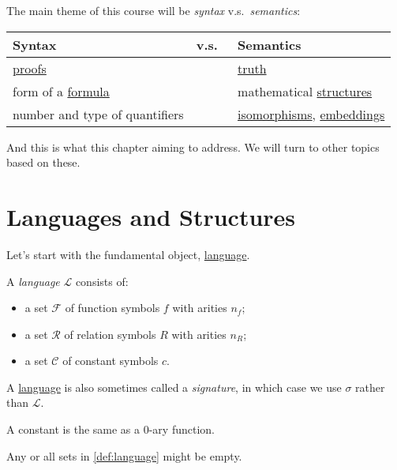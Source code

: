 The main theme of this course will be \emph{syntax} v.s.\ \emph{semantics}:
\begin{table}[H]
	\centering
	\begin{tabular}{lcl}
		\toprule
		Syntax                                    & v.s.\  & Semantics                                                                      \\
		\midrule
		\hyperref[def:proof]{proofs}              &        & \hyperref[def:truth]{truth}                                                    \\
		form of a \hyperref[def:formula]{formula} &        & mathematical \hyperref[def:structure]{structures}                              \\
		number and type of quantifiers            &        & \hyperref[def:isomorphism]{isomorphisms}, \hyperref[def:embedding]{embeddings} \\
		\bottomrule
	\end{tabular}
\end{table}
And this is what this chapter aiming to address. We will turn to other topics based on these.

\section{Languages and Structures}
Let's start with the fundamental object, \hyperref[def:language]{language}.

\begin{definition}[Language]\label{def:language}
	A \emph{language} \(\mathcal{L} \) consists of:
	\begin{itemize}
		\item a set \(\mathcal{F} \) of function symbols \(f\) with arities \(n_f\);
		\item a set \(\mathcal{R} \) of relation symbols \(R\) with arities \(n_R\);
		\item a set \(\mathcal{C} \) of constant symbols \(c\).
	\end{itemize}
\end{definition}

A \hyperref[def:language]{language} is also sometimes called a \emph{signature}, in which case we use \(\sigma \) rather than \(\mathcal{L} \).

\begin{note}
	A constant is the same as a \(0\)-ary function.
\end{note}

\begin{remark}
	Any or all sets in \autoref{def:language} might be empty.
\end{remark}


